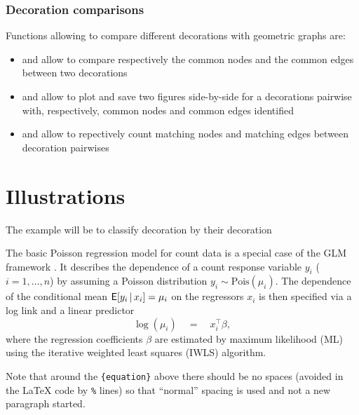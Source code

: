 \documentclass[article]{jss}
\begin{document}
\subsubsection{Decoration comparisons} \label{sec:functions_one}

Functions allowing to compare different decorations with geometric graphs are:

\begin{itemize}
  \item {} and  allow to compare respectively the common nodes and the common edges between two decorations
  \item {} and  allow to plot and save two figures side-by-side for a decorations pairwise with, respectively, common nodes and common edges identified
  \item {} and  allow to repectively count matching nodes and matching edges between decoration pairwises
\end{itemize}

\section{Illustrations} \label{sec:illustrations}

The example will be to classify decoration by their decoration


The basic Poisson regression model for count data is a special case of the GLM
framework \cite{McCullagh+Nelder:1989}. It describes the dependence of a count
response variable $y_i$ ($i = 1, \dots, n$) by assuming a Poisson distribution
$y_i \sim \mathrm{Pois}(\mu_i)$. The dependence of the conditional mean
$\mathsf{E}[y_i \, | \, x_i] = \mu_i$ on the regressors $x_i$ is then specified via a
log link and a linear predictor
%
\begin{equation} \label{eq:mean}
\log(\mu_i) \quad = \quad x_i^\top \beta,
\end{equation}
%
where the regression coefficients $\beta$ are estimated by maximum likelihood
(ML) using the iterative weighted least squares (IWLS) algorithm.

\begin{leftbar}
Note that around the \verb|{equation}| above there should be no spaces (avoided
in the {\LaTeX} code by \verb|%| lines) so that ``normal'' spacing is used and
not a new paragraph started.
\end{leftbar}
\end{document}
